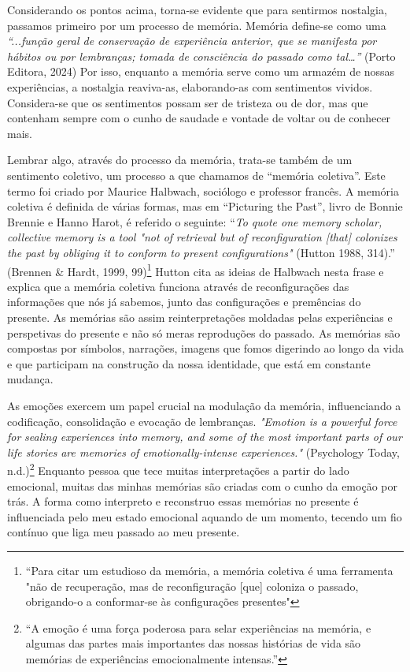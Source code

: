 \documentclass{article}
\begin{document}
 
Considerando os pontos acima, torna-se evidente que para sentirmos nostalgia, 
passamos  primeiro  por  um  processo  de  memória.  Memória  define-se  como  uma 
\textit{“...função geral de conservação de experiência anterior, que se manifesta por hábitos ou }
\textit{por lembranças; tomada de consciência do passado como tal…”} (Porto Editora, 2024) 
Por isso, enquanto a memória serve como um armazém de nossas experiências, a nostalgia 
reaviva-as,  elaborando-as  com  sentimentos  vividos.  Considera-se  que  os  sentimentos 
possam ser de tristeza ou de dor, mas que contenham sempre com o cunho de saudade e 
vontade de voltar ou de conhecer mais.  
 
Lembrar algo, através do processo da memória, trata-se também de um sentimento 
coletivo, um processo a que chamamos de “memória coletiva”. Este termo foi criado por 
Maurice  Halbwach,  sociólogo  e  professor  francês.  A  memória  coletiva  é  definida  de 
várias formas, mas em “Picturing the Past”, livro de Bonnie Brennie e Hanno Harot, é 
referido o seguinte: “\textit{To quote one memory scholar, collective memory is a tool "not of }
\textit{retrieval  but  of  reconfiguration  [that]  colonizes  the  past  by  obliging  it  to  conform  to }
\textit{present configurations"} (Hutton 1988, 314).” (Brennen \& Hardt, 1999, 99)\footnote{“Para citar um estudioso da memória, a memória coletiva é uma ferramenta "não de recuperação, mas de reconfiguração [que] coloniza o passado, obrigando-o a conformar-se às configurações presentes" } Hutton cita 
as ideias de Halbwach nesta frase e explica que a memória coletiva funciona através de 
reconfigurações  das  informações  que  nós  já  sabemos,  junto  das  configurações  e 
premências  do  presente.  As  memórias  são  assim  reinterpretações  moldadas  pelas 
experiências  e  perspetivas  do  presente  e  não  só  meras  reproduções  do  passado.  As 
memórias são compostas por símbolos, narrações, imagens que fomos digerindo ao longo 
da  vida  e  que  participam  na  construção  da  nossa  identidade,  que  está  em  constante 
mudança.  
  
 
 


 



 
As emoções exercem um papel crucial na modulação da memória, influenciando 
a codificação, consolidação e evocação de lembranças. \textit{"Emotion is a powerful force for }
\textit{sealing experiences into memory, and some of the most important parts of our life stories }
\textit{are memories of emotionally-intense experiences."} (Psychology Today, n.d.)\footnote{“A emoção é uma força poderosa para selar experiências na memória, e algumas das partes mais importantes das nossas histórias de vida são memórias de experiências emocionalmente intensas.” } Enquanto 
pessoa  que  tece  muitas  interpretações  a  partir  do  lado  emocional,  muitas  das  minhas 
memórias  são  criadas  com  o  cunho  da  emoção  por  trás.  A  forma  como  interpreto  e 
reconstruo  essas  memórias  no  presente  é  influenciada  pelo  meu  estado  emocional 
aquando de um momento, tecendo um fio contínuo que liga meu passado ao meu presente.  
 
\end{document}
